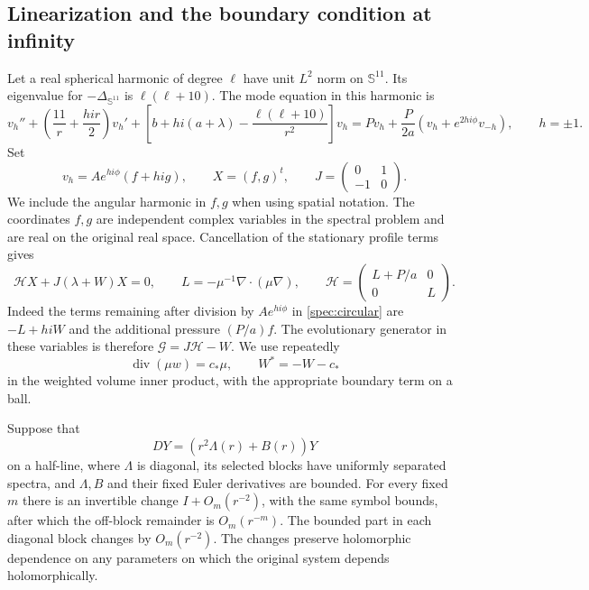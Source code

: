 \subsection{Linearization and the boundary condition at infinity}

Let a real spherical harmonic of degree $\ell$ have unit $L^2$ norm on
$\mathbb S^{11}$. Its eigenvalue for $-\Delta_{\mathbb S^{11}}$ is
$\ell(\ell+10)$. The mode equation in this harmonic is
\begin{equation}\label{spec:circular}
 v_h''+\left(\frac{11}{r}+\frac{hi r}{2}\right)v_h'
 +\left[b+hi(a+\lambda)-\frac{\ell(\ell+10)}{r^2}\right]v_h
 =Pv_h+\frac{P}{2a}(v_h+e^{2hi\phi}v_{-h}),\qquad h=\pm1.
\end{equation}
Set
\[
 v_h=Ae^{hi\phi}(f+hi g),\qquad X=(f,g)^t,
 \qquad J=\begin{pmatrix}0&1\\-1&0\end{pmatrix}.
\]
We include the angular harmonic in $f,g$ when using spatial notation.
The coordinates $f,g$ are independent complex variables in the spectral
problem and are real on the original real space.
Cancellation of the stationary profile terms gives
\begin{equation}\label{spec:real-system}
 \mathcal H X+J(\lambda+W)X=0,\qquad
 L=-\mu^{-1}\nabla\cdot(\mu\nabla),\qquad
 \mathcal H=\begin{pmatrix}L+P/a&0\\0&L\end{pmatrix}.
\end{equation}
Indeed the terms remaining after division by $Ae^{hi\phi}$ in
\eqref{spec:circular} are $-L+hiW$ and the additional pressure
$(P/a)f$. The evolutionary generator in these variables is therefore
$\mathcal G=J\mathcal H-W$. We use repeatedly
\begin{equation}\label{spec:divergence}
 \operatorname{div}(\mu w)=c_*\mu,
 \qquad W^*=-W-c_*
\end{equation}
in the weighted volume inner product, with the appropriate boundary
term on a ball.

\begin{lemma}\label{spec:block-reduction}
Suppose that
\[
 DY=(r^2\Lambda(r)+B(r))Y
\]
on a half-line, where $\Lambda$ is diagonal, its selected blocks have
uniformly separated spectra, and $\Lambda,B$ and their fixed Euler
derivatives are bounded. For every fixed $m$ there is an invertible
change $I+O_m(r^{-2})$, with the same symbol bounds, after which the
off-block remainder is $O_m(r^{-m})$. The bounded part in each diagonal
block changes by $O_m(r^{-2})$. The changes preserve holomorphic
dependence on any parameters on which the original system depends
holomorphically.
\end{lemma}

